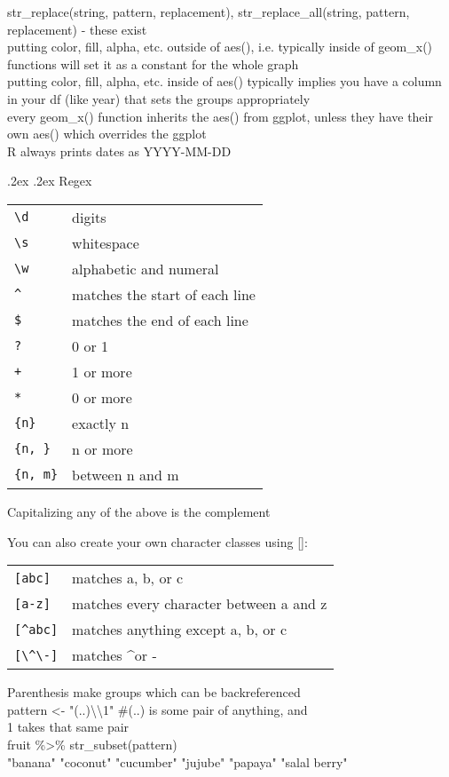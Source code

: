 \documentclass[10pt,landscape]{article}
\makeatletter
\renewcommand{\subsection}{\@startsection{subsection}{2}{0mm}%
                                {.2ex}%
                                {.2ex}%
                                {\normalfont\normalsize\bfseries}}
\makeatother
\begin{document}
\begin{multicols}{3}
str\_replace(string, pattern, replacement), str\_replace\_all(string, pattern, replacement) - these exist \\
putting color, fill, alpha, etc. outside of aes(), i.e. typically inside of geom\_x() functions will set it as a constant for the whole graph \\
putting color, fill, alpha, etc. inside of aes() typically implies you have a column in your df (like year) that sets the groups appropriately \\
every geom\_x() function inherits the aes() from ggplot, unless they have their own aes() which overrides the ggplot \\
R always prints dates as YYYY-MM-DD

\subsection{Regex}
\begin{tabular}{@{}p{\the\MyLen}%
                @{}p{\linewidth-\the\MyLen}@{}}
\verb!\d! & digits \\
\verb!\s!  & whitespace \\
\verb!\w!   & alphabetic and numeral \\
\verb!^! & matches the start of each line \\
\verb!$! & matches the end of each line \\
\verb!?! & 0 or 1 \\
\verb!+! & 1 or more \\
\verb!*! & 0 or more \\
\verb!{n}! & exactly n \\
\verb!{n, }! & n or more \\
\verb!{n, m}! & between n and m \\

\end{tabular}
Capitalizing any of the above is the complement 

You can also create your own character classes using []:
\begin{tabular}{@{}p{\the\MyLen}%
        @{}p{\linewidth-\the\MyLen}@{}}
\verb![abc]! & matches a, b, or c \\
\verb![a-z]!  & matches every character between a and z \\
\verb![^abc]!   & matches anything except a, b, or c \\
\verb![\^\-]!   & matches \textasciicircum or - \\
\end{tabular}
Parenthesis make groups which can be backreferenced \\
pattern <- "(..)\textbackslash\textbackslash1" \#(..) is some pair of anything, and \\1 takes that same pair  \\
fruit \%>\% str\_subset(pattern) \\
"banana"      "coconut"     "cucumber"    "jujube"    "papaya" "salal berry"


\end{multicols}
\end{document}

